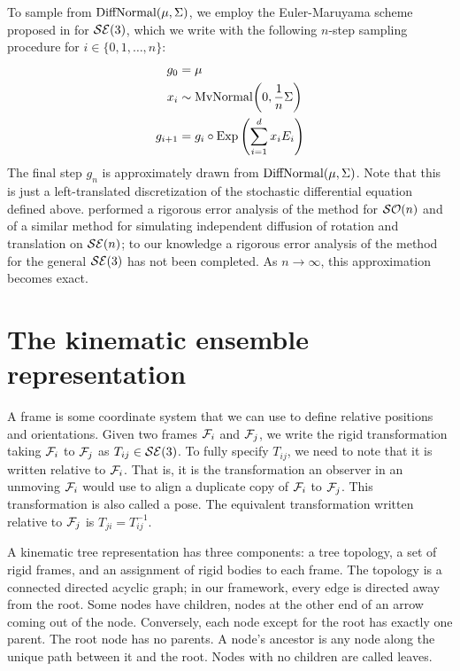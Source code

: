 \documentclass[../../main.tex]{subfiles}
\begin{document}
\begin{refsection}
	To sample from $\operatorname{DiffNormal}(\mu, \Sigma)$, we employ the Euler-Maruyama scheme proposed in \cite[Section IV]{wooramparkDiffusionBasedMotionPlanning2005} for $\mathcal{SE} (3)$, which we write with the following $n$-step sampling procedure for $i \in \{0, 1, \ldots, n\}$:
	\begin{align*}
		g_0       & = \mu                                               \\
		x_i       & \sim \mathrm{MvNormal}\qty( 0, \frac{1}{n} \Sigma ) \\
		g_{i + 1} & = g_i \circ \operatorname{Exp} \qty( \sum_{i=1}^d x_i E_i )
	\end{align*}
	The final step $g_n$ is approximately drawn from $\operatorname{DiffNormal}(\mu, \Sigma)$.
	Note that this is just a left-translated discretization of the stochastic differential equation defined above.
	\cite{piggottGeometricEulerMaruyama2016} performed a rigorous error analysis of the method for $\mathcal{SO} (n)$ and of a similar method for simulating independent diffusion of rotation and translation on $\mathcal{SE} (n)$; to our knowledge a rigorous error analysis of the method for the general $\mathcal{SE} (3)$ has not been completed.
	As $n \to \infty$, this approximation becomes exact.

	\section{The kinematic ensemble representation}\label{the-kinematic-ensemble-representation}

	A frame is some coordinate system that we can use to define relative positions and orientations.
	Given two frames $\mathcal{F}_i$ and $\mathcal{F}_j$, we write the rigid transformation taking $\mathcal{F}_i$ to $\mathcal{F}_j$ as $T_{ij} \in \mathcal{SE} (3)$.
	To fully specify $T_{ij}$, we need to note that it is written relative to $\mathcal{F}_i$.
	That is, it is the transformation an observer in an unmoving $\mathcal{F}_i$ would use to align a duplicate copy of $\mathcal{F}_i$ to $\mathcal{F}_j$.
	This transformation is also called a pose.
	The equivalent transformation written relative to $\mathcal{F}_j$ is $T_{ji} = T_{ij}^{-1}$.


	A kinematic tree representation has three components: a tree topology, a set of rigid frames, and an assignment of rigid bodies to each frame.
	The topology is a connected directed acyclic graph; in our framework, every edge is directed away from the root.
	Some nodes have children, nodes at the other end of an arrow coming out of the node.
	Conversely, each node except for the root has exactly one parent.
	The root node has no parents.
	A node's ancestor is any node along the unique path between it and the root.
	Nodes with no children are called leaves.


\end{refsection}
\end{document}
